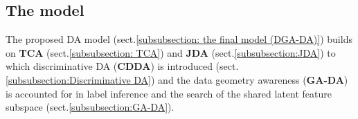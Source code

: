 \documentclass[journal,twocolumn]{IEEEtran}
\newcommand\luo[1]{{\footnotesize \color{blue}[#1 - \textbf{Luo}]}}
\begin{document}
\begin{CJK*}{UTF8}{gkai}
\subsection{The model}

\label{subsection:the model}
The proposed DA model (sect.\ref{subsubsection: the final model (DGA-DA)}) builds on \textbf{TCA} (sect.\ref{subsubsection: TCA}) and \textbf{JDA} (sect.\ref{subsubsection:JDA}) to which discriminative DA (\textbf{CDDA}) is introduced (sect.\ref{subsubsection:Discriminative DA}) and the data geometry awareness (\textbf{GA-DA}) is accounted for in label inference and the search of the shared latent feature subspace (sect.\ref{subsubsection:GA-DA}).



\end{CJK*}
\end{document}
